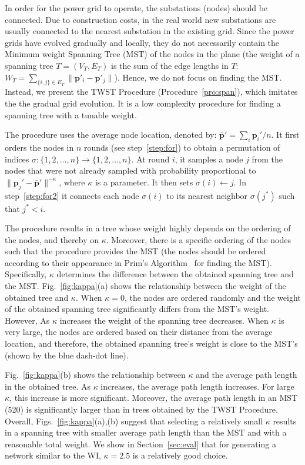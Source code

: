 \documentclass[10pt,journal]{IEEEtran}
\begin{document}
In order for the power grid to operate, the substations (nodes) should be connected. Due to construction costs, in the real world new substations are usually connected to the nearest substation in the existing grid. Since the power grids have evolved gradually and locally, they do not necessarily contain the Minimum weight Spanning Tree (MST) of the nodes in the plane (the weight of a spanning tree $T=(V_T,E_T)$ is the sum of the edge lengths in $T$:
 $W_T = \sum_{\{i,j\}\in E_T} \|\textbf{p}'_i-\textbf{p}'_j\|$).
 Hence, we do not focus on finding the MST. Instead, we present the TWST Procedure (Procedure~\ref{pro:span}), which imitates the the gradual grid evolution. It is a low complexity procedure for finding a spanning tree with a tunable weight.

The procedure uses the average node location, denoted by: $\bar{\textbf{p}}'=\sum_i \textbf{p}_i'/n$. It first orders the nodes in $n$ rounds (see step~\ref{step:for}) to obtain a permutation of indices $\sigma:\{1,2,\dots,n\}\rightarrow \{1,2,\dots,n\}$. At round $i$, it samples a node $j$ from the nodes that were not already sampled with probability proportional to $\|\textbf{p}_j'-\bar{\textbf{p}}'\|^{-\kappa}$, where $\kappa$ is a parameter. It then sets $\sigma(i)\leftarrow j$. In step~\ref{step:for2} it connects each node $\sigma(i)$ to its nearest neighbor $\sigma(j^*)$ such that $j^*<i$.


The procedure results in a tree whose weight highly depends on the ordering of the nodes, and thereby on $\kappa$. Moreover, there is a specific ordering of the nodes such that the procedure provides the MST (the nodes should be ordered according to their appearance in Prim's Algorithm~\cite{cormen2009introduction} for finding the MST).
Specifically, $\kappa$ determines the difference between the obtained spanning tree and the MST. Fig.~\ref{fig:kappa}(a) shows the relationship between the weight of the obtained tree and $\kappa$. When $\kappa=0$, the nodes are ordered randomly and the weight of the obtained spanning tree significantly differs from the MST's weight. However, As $\kappa$ increases the weight of the spanning tree decreases. When $\kappa$ is very large, the nodes are ordered based on their distance from the average location, and therefore, the obtained spanning tree's weight is close to the MST's (shown by the blue dash-dot line).



Fig.~\ref{fig:kappa}(b) shows the relationship between $\kappa$ and the average path length in the obtained tree. As $\kappa$ increases, the average path length increases. For large $\kappa$, this increase is more significant. Moreover, the average path length in an MST (520) is significantly larger than in trees obtained by the TWST Procedure. Overall, Figs.~\ref{fig:kappa}(a),(b) suggest that selecting a relatively small $\kappa$  results in a spanning tree with smaller average path length than the MST and with a reasonable total weight.  We show in Section~\ref{sec:eval} that for generating a network similar to the WI, $\kappa=2.5$ is a relatively good choice.
\end{document}
